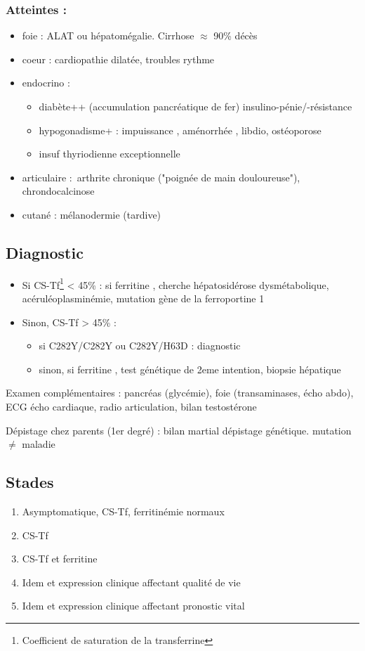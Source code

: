 \documentclass{book}
\begin{document}
\subsubsection{Atteintes :}
\label{sec:orgecdaaa0}
\begin{itemize}
\item foie : \inc ALAT ou hépatomégalie. Cirrhose \(\approx\) 90\% décès
\item coeur : cardiopathie dilatée, troubles rythme
\item endocrino :
\begin{itemize}
\item diabète++ (accumulation pancréatique de fer) insulino-pénie/-résistance
\item hypogonadisme+ : impuissance \male, aménorrhée \female, \dec libdio,
ostéoporose
\item insuf thyriodienne exceptionnelle
\end{itemize}
\item articulaire : arthrite chronique ("poignée de main douloureuse"), chrondocalcinose
\item cutané : mélanodermie (tardive)
\end{itemize}


\subsection{Diagnostic}
\label{sec:orgaa0d0f4}
\begin{itemize}
\item Si CS-Tf\footnote{Coefficient de saturation de la transferrine} < 45\% : si ferritine \inc, cherche hépatosidérose dysmétabolique,
acéruléoplasminémie, mutation gène de la ferroportine 1
\item Sinon, CS-Tf > 45\% : 
\begin{itemize}
\item si C282Y/C282Y ou C282Y/H63D : diagnostic
\item sinon, si ferritine \inc, test génétique de 2eme intention, biopsie
hépatique
\end{itemize}
\end{itemize}

Examen complémentaires : pancréas (glycémie),  foie (transaminases, écho abdo), ECG \textpm{} écho
cardiaque, radio articulation, bilan testostérone

Dépistage chez parents (1er degré) : bilan martial \textpm{} dépistage génétique. \danger mutation \(\neq\) maladie

\subsection{Stades}
\label{sec:orgc82775b}
\begin{enumerate}
\item Asymptomatique, CS-Tf, ferritinémie normaux
\item CS-Tf \inc
\item CS-Tf \inc et ferritine \inc
\item Idem et expression clinique affectant qualité de vie
\item Idem et expression clinique affectant pronostic vital
\end{enumerate}
\end{document}
